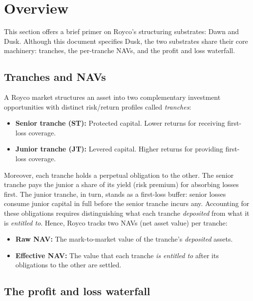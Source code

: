 \section{Overview}
\label{sec:overview}

This section offers a brief primer on Royco's structuring substrates: Dawn and Dusk.
Although this document specifies Dusk, the two substrates share their
core machinery: tranches, the per-tranche NAVs, and the profit and loss
waterfall.

\subsection{Tranches and NAVs}
\label{sec:overview:tranches}

A Royco market structures an asset into two complementary investment opportunities
with distinct risk/return profiles called \emph{tranches}:

\begin{itemize}
  \item \textbf{Senior tranche (ST):} Protected capital. Lower returns for receiving first-loss coverage.
  \item \textbf{Junior tranche (JT):} Levered capital. Higher returns for providing first-loss coverage.
\end{itemize}

Moreover, each tranche holds a perpetual obligation to the other. The
senior tranche pays the junior a share of its yield (risk premium)
for absorbing losses first. The junior tranche, in turn, stands
as a first-loss buffer: senior losses consume junior capital in full
before the senior tranche incurs any. Accounting for these obligations
requires distinguishing what each tranche \emph{deposited} from what it is
\emph{entitled to}. Hence, Royco tracks two NAVs (net asset value) per
tranche:

\begin{itemize}
  \item \textbf{Raw NAV:} The mark-to-market value of the tranche's \emph{deposited} assets.
  \item \textbf{Effective NAV:} The value that each tranche \emph{is entitled to} after its obligations to the other are settled.
\end{itemize}

\subsection{The profit and loss waterfall}
\label{sec:overview:waterfall}

